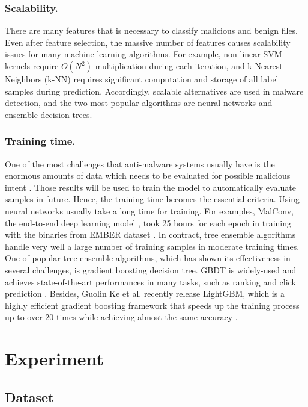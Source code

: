 \documentclass[runningheads]{llncs}
\begin{document}
\subsubsection{Scalability.}

There are many features that is necessary to classify malicious and benign files. Even after feature selection, the massive number of features causes scalability issues for many machine learning algorithms. For example, non-linear SVM kernels require $O(N^2)$ multiplication during each iteration, and k-Nearest Neighbors (k-NN) requires significant computation and storage of all label samples during prediction. Accordingly, scalable alternatives are used in malware detection, and the two most popular algorithms are neural networks and ensemble decision trees.

\subsubsection{Training time.}

One of the most challenges that anti-malware systems usually have is the enormous amounts of data which needs to be evaluated for possible malicious intent \cite{ronen2018microsoft}. Those results will be used to train the model to automatically evaluate samples in future. Hence, the training time becomes the essential criteria. Using neural networks usually take a long time for training. For examples, MalConv, the end-to-end deep learning model \cite{raff2017malware}, took 25 hours for each epoch in training with the binaries from EMBER dataset \cite{anderson2018ember}. In contract, tree ensemble algorithms handle very well a large number of training samples in moderate training times. One of popular tree ensemble algorithms, which has shown its effectiveness in several challenges, is gradient boosting decision tree. GBDT is widely-used and achieves state-of-the-art performances in many tasks, such as ranking \cite{chris2010ranknet} and click prediction \cite{richardson2007predicting}. Besides, Guolin Ke et al. recently release LightGBM, which is a highly efficient gradient boosting framework that speeds up the training process up to over 20 times while achieving almost the same accuracy \cite{ke2017lightgbm}.

\section{Experiment}

\subsection{Dataset}
\end{document}
